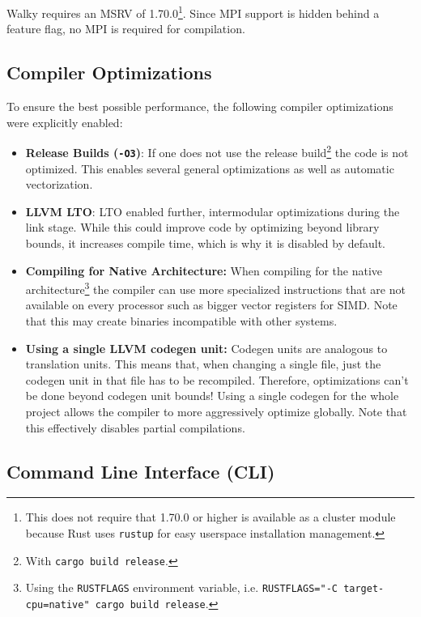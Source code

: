 Walky requires an \ac{MSRV} of 1.70.0\footnote{This does not require that 1.70.0 or higher is available as a cluster module because Rust uses \texttt{rustup} \cite{noauthor_rustuprs_nodate} for easy userspace installation management.}. Since \ac{MPI} support is hidden behind a feature flag, no \ac{MPI} is required for compilation.


\subsection{Compiler Optimizations}
To ensure the best possible performance, the following compiler optimizations were explicitly enabled:
\begin{itemize}
  \item \textbf{Release Builds (\texttt{-O3})}: If one does not use the release build\footnote{With \texttt{cargo build \textemdash\textemdash release}.} the code is not optimized. This enables several general optimizations as well as automatic vectorization.
  \item \textbf{\ac{LLVM} \ac{LTO}}: \ac{LTO} enabled further, intermodular optimizations during the link stage. While this could improve code by optimizing beyond library bounds, it increases compile time, which is why it is disabled by default.
  \item \textbf{Compiling for Native Architecture:} When compiling for the native architecture\footnote{Using the \texttt{RUSTFLAGS} environment variable, i.e. \texttt{RUSTFLAGS="-C target-cpu=native" cargo build \textemdash\textemdash release}.} the compiler can use more specialized instructions that are not available on every processor such as bigger vector registers for SIMD. Note that this may create binaries incompatible with other systems.
  \item \textbf{Using a single \ac{LLVM} codegen unit:} Codegen units are analogous to translation units. This means that, when changing a single file, just the codegen unit in that file has to be recompiled. Therefore, optimizations can't be done beyond codegen unit bounds! Using a single codegen for the whole project allows the compiler to more aggressively optimize globally. Note that this effectively disables partial compilations.
\end{itemize}

\subsection{Command Line Interface (CLI)}

